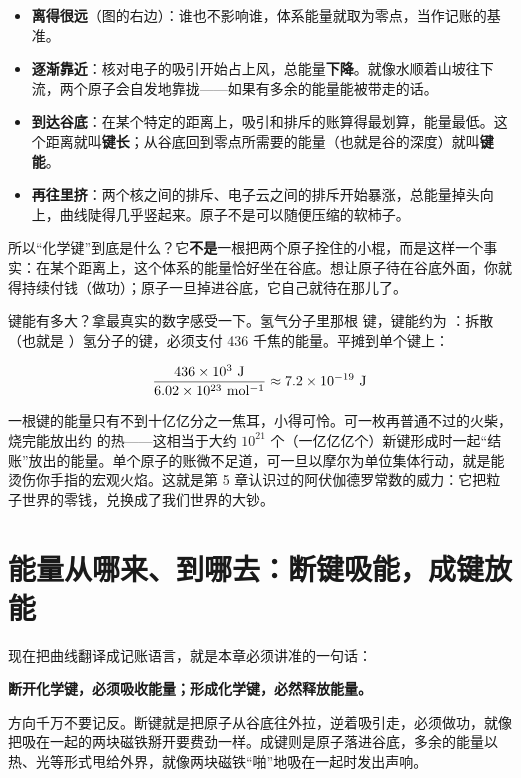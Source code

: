 \begin{itemize}[itemsep=2pt]
\item \textbf{离得很远}（图的右边）：谁也不影响谁，体系能量就取为零点，当作记账的基准。
\item \textbf{逐渐靠近}：核对电子的吸引开始占上风，总能量\textbf{下降}。就像水顺着山坡往下流，两个原子会自发地靠拢——如果有多余的能量能被带走的话。
\item \textbf{到达谷底}：在某个特定的距离上，吸引和排斥的账算得最划算，能量最低。这个距离就叫\textbf{键长}；从谷底回到零点所需要的能量（也就是谷的深度）就叫\textbf{键能}。
\item \textbf{再往里挤}：两个核之间的排斥、电子云之间的排斥开始暴涨，总能量掉头向上，曲线陡得几乎竖起来。原子不是可以随便压缩的软柿子。
\end{itemize}

所以“化学键”到底是什么？它\textbf{不是}一根把两个原子拴住的小棍，而是这样一个事实：在某个距离上，这个体系的能量恰好坐在谷底。想让原子待在谷底外面，你就得持续付钱（做功）；原子一旦掉进谷底，它自己就待在那儿了。

\begin{qiaoliang}
键能有多大？拿最真实的数字感受一下。氢气分子里那根  键，键能约为 ：拆散 （也就是 ）氢分子的键，必须支付 436 千焦的能量。平摊到单个键上：

\[ \frac{436\times 10^{3}\ \mathrm{J}}{\ud{6.02\times 10^{23}}{mol^{-1}}} \approx 7.2\times 10^{-19}\ \mathrm{J} \]

一根键的能量只有不到十亿亿分之一焦耳，小得可怜。可一枚再普通不过的火柴，烧完能放出约  的热——这相当于大约 $10^{21}$ 个（一亿亿亿个）新键形成时一起“结账”放出的能量。单个原子的账微不足道，可一旦以摩尔为单位集体行动，就是能烫伤你手指的宏观火焰。这就是第 5 章认识过的阿伏伽德罗常数的威力：它把粒子世界的零钱，兑换成了我们世界的大钞。
\end{qiaoliang}

\section{能量从哪来、到哪去：断键吸能，成键放能}

现在把曲线翻译成记账语言，就是本章必须讲准的一句话：

\textbf{断开化学键，必须吸收能量；形成化学键，必然释放能量。}

方向千万不要记反。断键就是把原子从谷底往外拉，逆着吸引走，必须做功，就像把吸在一起的两块磁铁掰开要费劲一样。成键则是原子落进谷底，多余的能量以热、光等形式甩给外界，就像两块磁铁“啪”地吸在一起时发出声响。

